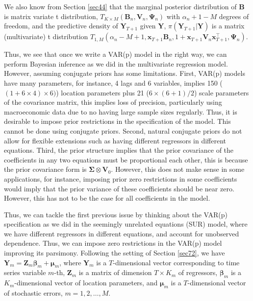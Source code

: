 We also know from Section \ref{sec44} that the marginal posterior distribution of $\bm{B}$ is matrix variate t distribution, $T_{K\times M}({\bm{B}}_n,{\bm{V}}_n,{\bm{\Psi}}_n)$ with $\alpha_n+1-M$ degrees of freedom, and the predictive density of ${\bm{Y}}_{T+1}$ given ${\bm{Y}}$, $\pi({\bm{Y}}_{T+1}|{\bm{Y}})$ is a matrix (multivariate) t distribution $T_{1,M}(\alpha_n-M+1,{\bm{x}}_{T+1}{\bm{B}}_n,1+{\bm{x}}_{T+1}{\bm{V}}_n{\bm{x}}_{T+1}^{\top},{\bm{\Psi}}_n)$.

Thus, we see that once we write a VAR(p) model in the right way, we can perform Bayesian inference as we did in the multivariate regression model. However, assuming conjugate priors has some limitations. First, VAR(p) models have many parameters, for instance, 4 lags and 6 variables, implies 150 ($(1 + 6\times4)\times 6)$) location parameters plus 21 ($6\times(6+1)/2$) scale parameters of the covariance matrix, this implies loss of precision, particularly using macroeconomic data due to no having large sample sizes regularly. Thus, it is desirable to impose prior restrictions in the specification of the model. This cannot be done using conjugate priors. Second, natural conjugate priors do not allow for flexible extensions such as having different regressors in different equations. Third, the prior structure implies that the prior covariance of the coefficients in any two equations must be proportional each other, this is because the prior covariance form is $\bm{\Sigma}\otimes \bm{V}_0$. However, this does not make sense in some applications, for instance, imposing prior zero restrictions in some coefficients would imply that the prior variance of these coefficients should be near zero. However, this has not to be the case for all coefficients in the model.

Thus, we can tackle the first previous issue by thinking about the VAR(p) specification as we did in the seemingly unrelated equations (SUR) model, where we have different regressors in different equations, and account for unobserved dependence. Thus, we can impose zero restrictions in the VAR(p) model improving its parsimony. Following the setting of Section \ref{sec72}, we have $\bm{Y}_{m}=\bm{Z}_{m}\bm{\beta}_m+\bm{\mu}_{m}$, where $\bm{Y}_m$ is a $T$-dimensional vector corresponding to time series variable $m$-th, $\bm{Z}_m$ is a matrix of dimension $T\times K_m$ of regressors, $\bm{\beta}_m$ is a $K_m$-dimensional vector of location parameters, and $\bm{\mu}_m$ is a $T$-dimensional vector of stochastic errors, $m=1,2,\dots,M$. 

